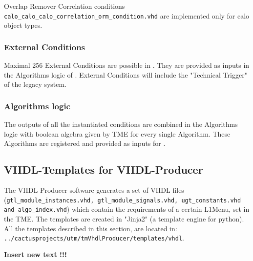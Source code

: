 Overlap Remover Correlation conditions \texttt{calo\_calo\_calo\_correlation\_orm\_condition.vhd} are implemented only for calo object types.

% 

\subsubsection{External Conditions}
\label{sec:gtl:external_conditions}
Maximal 256 External Conditions are possible in \gt. They are provided as inputs in the Algorithms logic of \ugtl.
External Conditions will include the "Technical Trigger" of the legacy system.

\subsubsection{Algorithms logic}
\label{sec:gtl:algorithms_logic}

The outputs of all the instantiated conditions are combined in the Algorithms logic with boolean algebra given by TME for every single Algorithm. These Algorithms are registered and provided
as inputs for \fdl.

\clearpage

\subsection{VHDL-Templates for VHDL-Producer}
\label{sec:gtl:templates_tme}

The VHDL-Producer software generates a set of VHDL files (\texttt{gtl\_module\_instances.vhd, gtl\_module\_signals.vhd, ugt\_constants.vhd and algo\_index.vhd}) which contain the requirements
of a certain L1Menu, set in the TME. The templates are created in "Jinja2" (a template engine for python).
All the templates described in this section, are located in:\\\texttt{../cactusprojects/utm/tmVhdlProducer/templates/vhdl}.

\textbf{Insert new text !!!}

